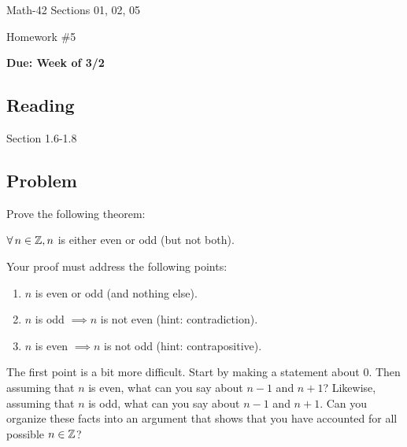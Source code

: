 \documentclass[letterpaper,12pt,fleqn]{article}
\begin{document}
\begin{center}
  \large
  Math-42 Sections 01, 02, 05

  \Large
  Homework \#5

  \large
  \textbf{Due: Week of 3/2}
\end{center}

\subsection*{Reading}

Section 1.6-1.8

\subsection*{Problem}

Prove the following theorem:

\begin{theorem}
  \(\forall\,n\in\mathbb{Z},n\) is either even or odd (but not both).
\end{theorem}

Your proof must address the following points:
\begin{enumerate}
\item \(n\) is even or odd (and nothing else).
\item \(n\) is odd \(\implies n\) is not even (hint: contradiction).
\item \(n\) is even \(\implies n\) is not odd (hint: contrapositive).
\end{enumerate}

The first point is a bit more difficult.  Start by making a statement about 0.  Then assuming that \(n\) is even,
what can you say about \(n-1\) and \(n+1\)?  Likewise, assuming that \(n\) is odd, what can you say about \(n-1\)
and \(n+1\).  Can you organize these facts into an argument that shows that you have accounted for all possible
\(n\in\mathbb{Z}\)?
\end{document}
